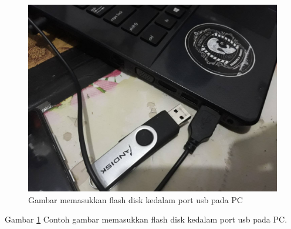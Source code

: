 	\begin{figure}[ht]
	\centerline{\includegraphics[width=1\textwidth]{figures/usb1.jpg}}
	\caption{Gambar memasukkan flash disk kedalam port usb pada PC}
	\label{Gambar}
	\end{figure}
      
      Gambar \ref{Gambar} Contoh gambar memasukkan flash disk kedalam port usb pada PC.

